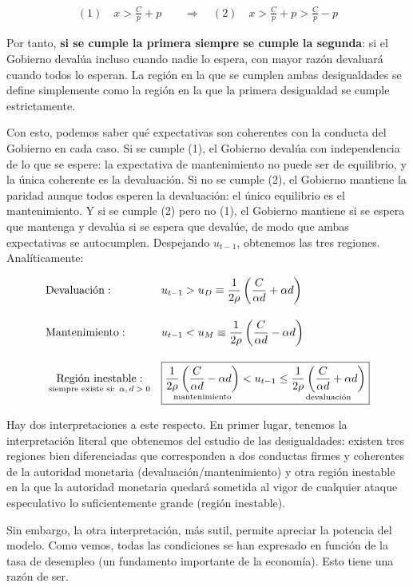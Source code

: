 \documentclass[10pt,a4paper]{article}
\begin{document}
$$\begin{aligned}
    (1)\quad x>\frac{C}{p}+p\qquad \Longrightarrow\quad (2)\quad x>\frac{C}{p}+p>\frac{C}{p}-p
\end{aligned}$$

Por tanto, \textbf{si se cumple la primera siempre se cumple la segunda}: si el Gobierno devalúa incluso cuando nadie lo espera, con mayor razón devaluará cuando todos lo esperan. La región en la que se cumplen ambas desigualdades se define simplemente como la región en la que la primera desigualdad se cumple estrictamente.

Con esto, podemos saber qué expectativas son coherentes con la conducta del Gobierno en cada caso. Si se cumple (1), el Gobierno devalúa con independencia de lo que se espere: la expectativa de mantenimiento no puede ser de equilibrio, y la única coherente es la devaluación. Si no se cumple (2), el Gobierno mantiene la paridad aunque todos esperen la devaluación: el único equilibrio es el mantenimiento. Y si se cumple (2) pero no (1), el Gobierno mantiene si se espera que mantenga y devalúa si se espera que devalúe, de modo que ambas expectativas se autocumplen. Despejando $u_{t-1}$, obtenemos las tres regiones. Analíticamente:

$$\begin{aligned}
  &\text{Devaluación}:&&u_{t-1}>u_D\equiv\frac{1}{2\rho}\left(\frac{C}{\alpha d}+\alpha d\right)\\[1em]
  &\text{Mantenimiento}: && u_{t-1}<u_M\equiv\frac{1}{2\rho}\left(\frac{C}{\alpha d}-\alpha d\right)\\[1em]
  &\underset{\text{\scriptsize siempre existe si: $\alpha, d>0$}}{\text{Región inestable}:}&&\boxed{\underset{\text{\scriptsize mantenimiento}}{\frac{1}{2\rho}\left(\frac{C}{\alpha d}-\alpha d\right)}<u_{t-1}\leq \underset{\text{\scriptsize devaluación}}{\frac{1}{2\rho}\left(\frac{C}{\alpha d}+\alpha d\right)}}
\end{aligned}$$

Hay dos interpretaciones a este respecto. En primer lugar, tenemos la interpretación literal que obtenemos del estudio de las desigualdades: existen tres regiones bien diferenciadas que corresponden a dos conductas firmes y coherentes de la autoridad monetaria (devaluación/mantenimiento) y otra región inestable en la que la autoridad monetaria quedará sometida al vigor de cualquier ataque especulativo lo suficientemente grande (región inestable).

Sin embargo, la otra interpretación, más sutil, permite apreciar la potencia del modelo. Como vemos, todas las condiciones se han expresado en función de la tasa de desempleo (un fundamento importante de la economía). Esto tiene una razón de ser.
\end{document}
